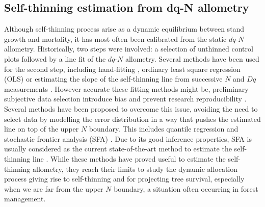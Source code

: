 \documentclass[12pt,english]{article}
\begin{document}
\subsection{Self-thinning estimation from dq-N allometry} 
	Although self-thinning process arise as a dynamic equilibrium between stand growth and mortality, it has most often been calibrated from the static $dq$-$N$ allometry. Historically, two steps were involved: a selection of unthinned control plots followed by a line fit of the $dq$-$N$ allometry. Several methods have been used for the second step, including hand-fitting \citep{Reineke1933}, ordinary least square regression (OLS) \citep{ZhangBiGoveEtAl2005} or estimating the slope of the self-thinning line from successive $N$ and $Dq$ measurements \citep{PretzschBiber2005, VanderSchaafBurkhart2007}. However accurate these fitting methods might be, preliminary subjective data selection introduce bias and prevent research reproducibility \citep{BiWanTurvey2000}. Several methods have  been proposed to overcome this issue, avoiding the need to select data by modelling the error distribution in a way that pushes the estimated line on top of the upper $N$ boundary. This includes quantile regression \citep{ZhangBiGoveEtAl2005} and stochastic frontier analysis (SFA) \citep{BiWanTurvey2000}. Due to its good inference properties, SFA is usually considered as the current state-of-the-art method to estimate the self-thinning line \citep{Bi2001, WeiskittelGouldTemesgen2009, CharruSeynaveMorneauEtAl2012, ZhangBiGoveEtAl2005}. While these methods have proved useful to estimate the self-thinning allometry, they reach their limits to study the dynamic allocation process giving rise to self-thinning and for projecting tree survival, especially when we are far from the upper $N$ boundary, a situation often occurring in forest management.


\end{document}
